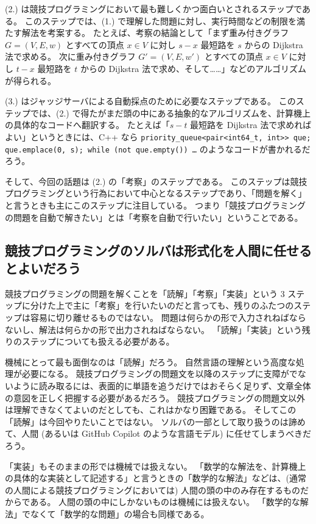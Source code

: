 \documentclass{ltjsarticle}
\begin{document}
(2.) は競技プログラミングにおいて最も難しくかつ面白いとされるステップである。
このステップでは、(1.) で理解した問題に対し、実行時間などの制限を満たす解法を考案する。
たとえば、考察の結論として「まず重み付きグラフ $G = (V, E, w)$ とすべての頂点 $x \in V$ に対し $s-x$ 最短路を $s$ からの Dijkstra 法で求める。
次に重み付きグラフ $G' = (V, E, w')$ とすべての頂点 $x \in V$ に対し $t-x$ 最短路を $t$ からの Dijkstra 法で求め、そして……」などのアルゴリズムが得られる。

(3.) はジャッジサーバによる自動採点のために必要なステップである。
このステップでは、(2.) で得たがまだ頭の中にある抽象的なアルゴリズムを、計算機上の具体的なコードへ翻訳する。
たとえば「$s-t$ 最短路を Dijkstra 法で求めればよい」というときには、C++ なら
\verb|priority_queue<pair<int64_t, int>> que; que.emplace(0, s); while (not que.empty()) …|
のようなコードが書かれるだろう。

そして、今回の話題は (2.) の「考察」のステップである。
このステップは競技プログラミングという行為において中心となるステップであり、「問題を解く」と言うときも主にこのステップに注目している。
つまり「競技プログラミングの問題を自動で解きたい」とは「考察を自動で行いたい」ということである。



\subsection{競技プログラミングのソルバは形式化を人間に任せるとよいだろう}

競技プログラミングの問題を解くことを「読解」「考察」「実装」という 3 ステップに分けた上で主に「考察」を行いたいのだと言っても、残りのふたつのステップは容易に切り離せるものではない。
問題は何らかの形で入力されねばならないし、解法は何らかの形で出力されねばならない。
「読解」「実装」という残りのステップについても扱える必要がある。

機械にとって最も面倒なのは「読解」だろう。
自然言語の理解という高度な処理が必要になる。
競技プログラミングの問題文を以降のステップに支障がでないように読み取るには、表面的に単語を追うだけではおそらく足りず、文章全体の意図を正しく把握する必要があるだろう。
競技プログラミングの問題文以外は理解できなくてよいのだとしても、これはかなり困難である。
そしてこの「読解」は今回やりたいことではない。
ソルバの一部として取り扱うのは諦めて、人間 (あるいは GitHub Copilot のような言語モデル) に任せてしまうべきだろう。

「実装」もそのままの形では機械では扱えない。
「数学的な解法を、計算機上の具体的な実装として記述する」と言うときの「数学的な解法」などは、(通常の人間による競技プログラミングにおいては) 人間の頭の中のみ存在するものだからである。
人間の頭の中にしかないものは機械には扱えない。
「数学的な解法」でなくて「数学的な問題」の場合も同様である。
\end{document}
